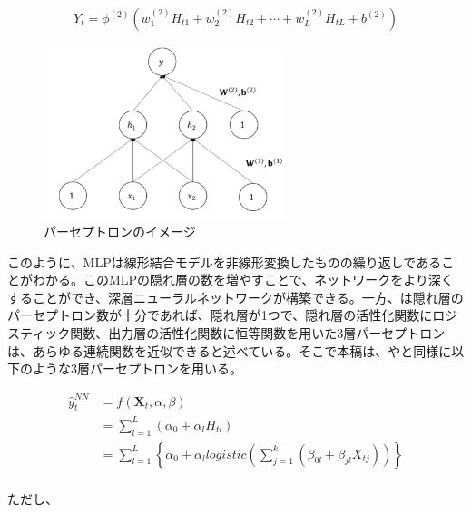 \documentclass[a4paper, 12pt]{jsarticle}
\begin{document}
\begin{equation}
  \begin{split}
    Y_t = \phi^{(2)}(w^{(2)}_{1} H_{t1} + w^{(2)}_{2} H_{t2} + \cdots + w^{(2)}_{L} H_{tL} + b^{(2)})
  \end{split}
\end{equation}

\begin{figure}
  \centering
  \caption{パーセプトロンのイメージ}
  \label{fig:mlp}
  \includegraphics[width=7cm]{./img/_ann_mlp.png}
\end{figure}

このように、MLPは線形結合モデルを非線形変換したものの繰り返しであることがわかる。このMLPの隠れ層の数を増やすことで、ネットワークをより深くすることができ、深層ニューラルネットワークが構築できる。一方、\cite{qi1999nonlinear}は隠れ層のパーセプトロン数が十分であれば、隠れ層が1つで、隠れ層の活性化関数にロジスティック関数、出力層の活性化関数に恒等関数を用いた3層パーセプトロンは、あらゆる連続関数を近似できると述べている。そこで本稿は、\cite{callen1996neural}や\cite{zhang2004neural}と同様に以下のような3層パーセプトロンを用いる。

\begin{equation}
  \begin{split}
    \hat{y}_t^{NN} 
    &= f({\bm{X}_t, \alpha, \beta}) \\
    &= \sum^{L}_{l=1} \left(\alpha_0 + \alpha_l H_{tl} \right) \\
    &= \sum^{L}_{l=1} \left\{ \alpha_0 + \alpha_l \textit{logistic} \left(\sum^{k}_{j=1} \left(\beta_{0l} + \beta_{jl} X_{tj} \right) \right) \right\} \\
  \end{split}
\end{equation}

ただし、
\end{document}
